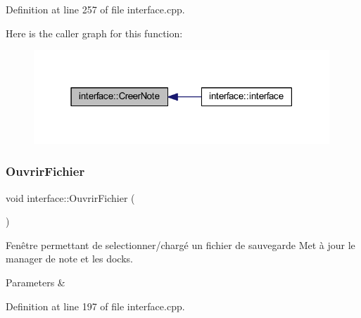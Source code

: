 Definition at line 257 of file interface.\+cpp.

Here is the caller graph for this function\+:\nopagebreak
\begin{figure}[H]
\begin{center}
\leavevmode
\includegraphics[width=315pt]{classinterface_a23957135caad59d8850fe8e2cbee28a3_icgraph}
\end{center}
\end{figure}
\mbox{\label{classinterface_af42d8f6426ad19ce13f1dd2ce9f519c1}} 
\subsubsection{\texorpdfstring{Ouvrir\+Fichier}{OuvrirFichier}}
{\footnotesize\ttfamily void interface\+::\+Ouvrir\+Fichier (\begin{DoxyParamCaption}{ }\end{DoxyParamCaption})\hspace{0.3cm}{\ttfamily [slot]}}



Fenêtre permettant de selectionner/chargé un fichier de sauvegarde Met à jour le manager de note et les docks. 


\begin{DoxyParams}{Parameters}
{\em } & \\
\hline
\end{DoxyParams}


Definition at line 197 of file interface.\+cpp.

